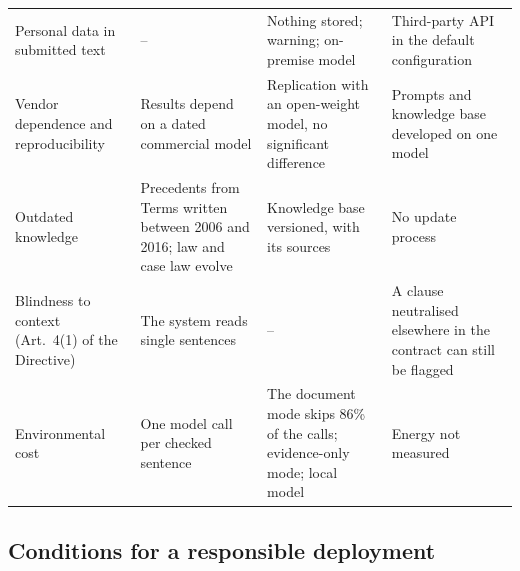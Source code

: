 \begin{table}[t]
\begin{tabularx}{\textwidth}{@{}P{2.7cm}YYY@{}}
Personal data in submitted text & -- & Nothing stored; warning; on-premise model & Third-party API in the default configuration \\
Vendor dependence and reproducibility & Results depend on a dated commercial model & Replication with an open-weight model, no significant difference & Prompts and knowledge base developed on one model \\
Outdated knowledge & Precedents from Terms written between 2006 and 2016; law and case law evolve & Knowledge base versioned, with its sources & No update process \\
Blindness to context (Art.~4(1) of the Directive) & The system reads single sentences & -- & A clause neutralised elsewhere in the contract can still be flagged \\
Environmental cost & One model call per checked sentence & The document mode skips 86\% of the calls; evidence-only mode; local model & Energy not measured \\
\bottomrule
\end{tabularx}
\end{table}

\subsection{Conditions for a responsible deployment}
\label{sec:ethics-conditions}

